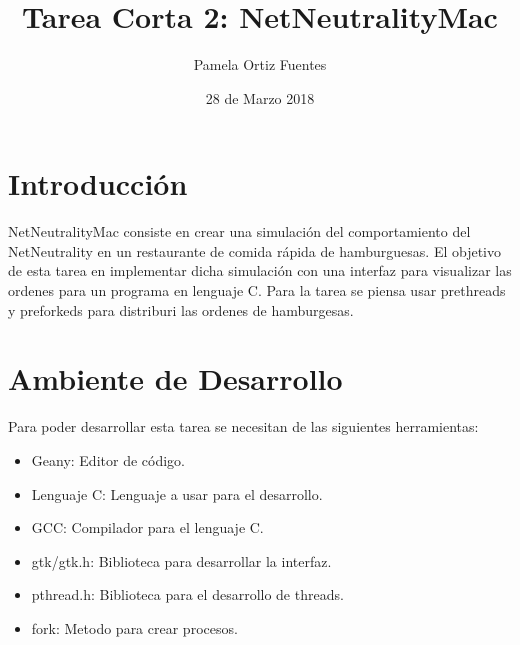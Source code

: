 \documentclass{article}
\title{Tarea Corta 2: NetNeutralityMac}
\author{Pamela Ortiz Fuentes}
\date{28 de Marzo 2018}
\begin{document}
\maketitle

\section{Introducción}
NetNeutralityMac consiste en crear una simulación del comportamiento del NetNeutrality en un restaurante de comida rápida de hamburguesas.
El objetivo de esta tarea en implementar dicha simulación con una interfaz para visualizar las ordenes para un programa en lenguaje C.
Para la tarea se piensa usar prethreads y preforkeds para distriburi las ordenes de hamburgesas.


\section{Ambiente de Desarrollo}
Para poder desarrollar esta tarea se necesitan de las siguientes herramientas:
    \begin{itemize}
        \item Geany: Editor de código.
        \item Lenguaje C: Lenguaje a usar para el desarrollo.
        \item GCC: Compilador para el lenguaje C.
        \item gtk/gtk.h: Biblioteca para desarrollar la interfaz.
        \item pthread.h: Biblioteca para el desarrollo de threads.
        \item fork: Metodo para crear procesos.
        
    \end{itemize}
\end{document}
